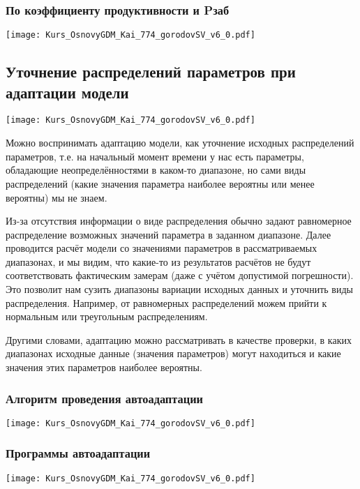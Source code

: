 \documentclass[main.tex]{subfiles}
\begin{document}
\subsubsection{По коэффициенту продуктивности и Pзаб}

\texttt{[image: Kurs\_OsnovyGDM\_Kai\_774\_gorodovSV\_v6\_0.pdf]}

\subsection{Уточнение распределений параметров при адаптации модели}

\texttt{[image: Kurs\_OsnovyGDM\_Kai\_774\_gorodovSV\_v6\_0.pdf]}

Можно воспринимать адаптацию модели, как уточнение исходных распределений параметров, т.е. на начальный момент времени у нас есть параметры, обладающие неопределённостями в каком-то диапазоне, но сами виды распределений (какие значения параметра наиболее вероятны или менее вероятны) мы не знаем.

Из-за отсутствия информации о виде распределения обычно задают равномерное распределение возможных значений параметра в заданном диапазоне.
Далее проводится расчёт модели со значениями параметров в рассматриваемых диапазонах, и мы видим, что какие-то из результатов расчётов не будут соответствовать фактическим замерам (даже с учётом допустимой погрешности).
Это позволит нам сузить диапазоны вариации исходных данных и уточнить виды распределения.
Например, от равномерных распределений можем прийти к нормальным или треугольным распределениям.

Другими словами, адаптацию можно рассматривать в качестве проверки, в каких диапазонах исходные данные (значения параметров) могут находиться и какие значения этих параметров наиболее вероятны.

\subsubsection{Алгоритм проведения автоадаптации}

\texttt{[image: Kurs\_OsnovyGDM\_Kai\_774\_gorodovSV\_v6\_0.pdf]}

\subsubsection{Программы автоадаптации}

\texttt{[image: Kurs\_OsnovyGDM\_Kai\_774\_gorodovSV\_v6\_0.pdf]}
\end{document}
